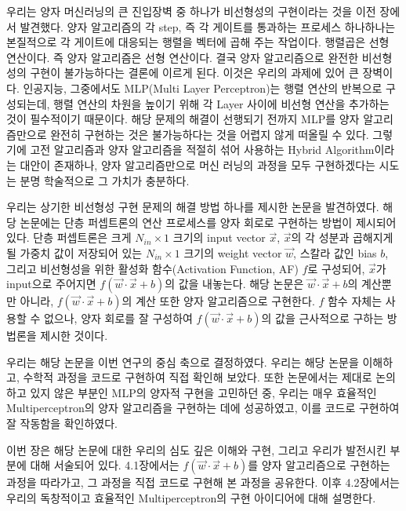 우리는 양자 머신러닝의 큰 진입장벽 중 하나가 비선형성의 구현이라는 것을 이전 장에서 발견했다.
양자 알고리즘의 각 step, 즉 각 게이트를 통과하는 프로세스 하나하나는 본질적으로 각 게이트에 대응되는 행렬을 벡터에 곱해 주는 작업이다.
행렬곱은 선형 연산이다. 즉 양자 알고리즘은 선형 연산이다. 결국 양자 알고리즘으로 완전한 비선형성의 구현이 불가능하다는 결론에 이르게 된다. 이것은 우리의 과제에 있어 큰 장벽이다.
인공지능, 그중에서도 MLP(Multi Layer Perceptron)는 행렬 연산의 반복으로 구성되는데, 행렬 연산의 차원을 높이기 위해 각 Layer 사이에 비선형 연산을 추가하는 것이 필수적이기 때문이다.
해당 문제의 해결이 선행되기 전까지 MLP를 양자 알고리즘만으로 완전히 구현하는 것은 불가능하다는 것을 어렵지 않게 떠올릴 수 있다.
그렇기에 고전 알고리즘과 양자 알고리즘을 적절히 섞어 사용하는 Hybrid Algorithm이라는 대안이 존재하나, 양자 알고리즘만으로 머신 러닝의 과정을 모두 구현하겠다는 시도는 분명 학술적으로 그 가치가 충분하다.

우리는 상기한 비선형성 구현 문제의 해결 방법 하나를 제시한 논문을 발견하였다.
해당 논문에는 단층 퍼셉트론의 연산 프로세스를 양자 회로로 구현하는 방법이 제시되어 있다.
단층 퍼셉트론은 크게 \(N_{in} \times 1\) 크기의 input vector \(\vec{x}\), 
\(\vec{x}\)의 각 성분과 곱해지게 될 가중치 값이 저장되어 있는 \(N_{in} \times 1\) 크기의 weight vector \(\vec{w}\), 
스칼라 값인 bias \(b\), 그리고 비선형성을 위한 활성화 함수(Activation Function, AF) \(f\)로 구성되어,
\(\vec{x}\)가 input으로 주어지면 \(f(\vec{w}\cdot\vec{x}+b)\)의 값을 내놓는다.
해당 논문은 \(\vec{w}\cdot\vec{x}+b\)의 계산뿐만 아니라, \(f(\vec{w}\cdot\vec{x}+b)\)의 계산 또한 양자 알고리즘으로 구현한다.
\(f\) 함수 자체는 사용할 수 없으나, 양자 회로를 잘 구성하여 \(f(\vec{w}\cdot\vec{x}+b)\)의 값을 근사적으로 구하는 방법론을 제시한 것이다.

우리는 해당 논문을 이번 연구의 중심 축으로 결정하였다.
우리는 해당 논문을 이해하고, 수학적 과정을 코드로 구현하여 직접 확인해 보았다.
또한 논문에서는 제대로 논의하고 있지 않은 부분인 MLP의 양자적 구현을 고민하던 중, 우리는 매우 효율적인 Multiperceptron의 양자 알고리즘을 구현하는 데에 성공하였고, 이를 코드로 구현하여 잘 작동함을 확인하였다.

이번 장은 해당 논문에 대한 우리의 심도 깊은 이해와 구현, 그리고 우리가 발전시킨 부분에 대해 서술되어 있다.
4.1장에서는 \(f(\vec{w}\cdot\vec{x}+b)\)를 양자 알고리즘으로 구현하는 과정을 따라가고, 그 과정을 직접 코드로 구현해 본 과정을 공유한다.
이후 4.2장에서는 우리의 독창적이고 효율적인 Multiperceptron의 구현 아이디어에 대해 설명한다.

